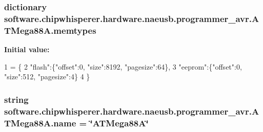 \subsubsection[{memtypes}]{\setlength{\rightskip}{0pt plus 5cm}dictionary software.\+chipwhisperer.\+hardware.\+naeusb.\+programmer\+\_\+avr.\+A\+T\+Mega88\+A.\+memtypes\hspace{0.3cm}{\ttfamily [static]}}\label{classsoftware_1_1chipwhisperer_1_1hardware_1_1naeusb_1_1programmer__avr_1_1ATMega88A_a29bea8d5e6fa561a24adde5292b38ea0}
{\bfseries Initial value\+:}
\begin{DoxyCode}
1 = \{
2        \textcolor{stringliteral}{"flash"}:\{\textcolor{stringliteral}{"offset"}:0, \textcolor{stringliteral}{"size"}:8192, \textcolor{stringliteral}{"pagesize"}:64\},
3        \textcolor{stringliteral}{"eeprom"}:\{\textcolor{stringliteral}{"offset"}:0, \textcolor{stringliteral}{"size"}:512, \textcolor{stringliteral}{"pagesize"}:4\}
4      \}
\end{DoxyCode}
\hypertarget{classsoftware_1_1chipwhisperer_1_1hardware_1_1naeusb_1_1programmer__avr_1_1ATMega88A_a3c08229bc645553842406ac6d3aed4a2}{}
\subsubsection[{name}]{\setlength{\rightskip}{0pt plus 5cm}string software.\+chipwhisperer.\+hardware.\+naeusb.\+programmer\+\_\+avr.\+A\+T\+Mega88\+A.\+name = \char`\"{}A\+T\+Mega88\+A\char`\"{}\hspace{0.3cm}{\ttfamily [static]}}\label{classsoftware_1_1chipwhisperer_1_1hardware_1_1naeusb_1_1programmer__avr_1_1ATMega88A_a3c08229bc645553842406ac6d3aed4a2}
\hypertarget{classsoftware_1_1chipwhisperer_1_1hardware_1_1naeusb_1_1programmer__avr_1_1ATMega88A_acc0af2cd29e9a889f66d8b0a4ad1200b}{}
